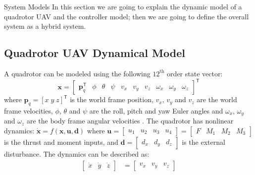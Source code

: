 
\begin{section}{System Models} \label{sec:model}
In this section we are going to explain the dynamic model of a quadrotor UAV and the controller model; then we are going to define the overall system as a hybrid system.

\subsection{Quadrotor UAV Dynamical Model}
A quadrotor can be modeled using the following $12^\text{{th}}$ order state vector:
\begin{equation*}
\bm{x} = \begin{bmatrix}\bm{p}_q^{\mathsf{T}} & \phi & \theta & \psi & v_x & v_y & v_z & \omega_{x} & \omega_{y} & \omega_{z}\end{bmatrix}^{\mathsf{T}}
\end{equation*}
where $\bm{p}_q=[x \; y \; z]^{\mathsf{T}}$ is the world frame position, $v_{x}$, $v_{y}$ and $v_z$ are the world frame velocities, $\phi$, $\theta$ and $\psi$ are the roll, pitch and yaw Euler angles and $\omega_{x}$, $\omega_{y}$ and $\omega_{z}$ are the body frame angular velocities \cite{BezzoAHS17, BezzoIROS2016}. The quadrotor has nonlinear dynamics: $ \dot{\boldsymbol{x}} = f(\boldsymbol{x}, \boldsymbol{u}, \boldsymbol{d}) $ where $ \boldsymbol{u} =  \begin{bmatrix} u_1 & u_2 & u_3 & u_4 \end{bmatrix} = \begin{bmatrix} F & M_1 & M_2 & M_3 \end{bmatrix} $ is the thrust and moment inputs, and $ \boldsymbol{d} = \begin{bmatrix} d_x & d_y & d_z \end{bmatrix} $ is the external disturbance. The dynamics can be described as:
\begin{equation*}
	\begin{aligned}
	\begin{bmatrix}\dot{x} & \dot{y} & \dot{z}\end{bmatrix} &= \begin{bmatrix}v_x & v_y & v_z\end{bmatrix}\\

\end{aligned}
\end{equation*}
\end{section}
